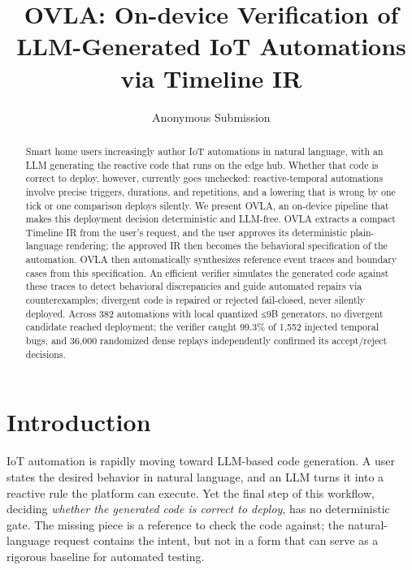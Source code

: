 \documentclass[sigconf,nonacm,anonymous,review]{acmart}
\title{OVLA: On-device Verification of LLM-Generated IoT Automations via Timeline IR}
\author{Anonymous Submission}
\affiliation{\institution{Submitted to SenSys 2027}\country{}}
\begin{document}
\begin{abstract}
Smart home users increasingly author IoT automations in natural language, with an LLM generating the reactive code that runs on the edge hub. Whether that code is correct to deploy, however, currently goes unchecked: reactive-temporal automations involve precise triggers, durations, and repetitions, and a lowering that is wrong by one tick or one comparison deploys silently. We present OVLA, an on-device pipeline that makes this deployment decision deterministic and LLM-free. OVLA extracts a compact Timeline IR from the user's request, and the user approves its deterministic plain-language rendering; the approved IR then becomes the behavioral specification of the automation. OVLA then automatically synthesizes reference event traces and boundary cases from this specification. An efficient verifier simulates the generated code against these traces to detect behavioral discrepancies and guide automated repairs via counterexamples; divergent code is repaired or rejected fail-closed, never silently deployed. Across 382 automations with local quantized ≤9B generators, no divergent candidate reached deployment; the verifier caught 99.3\% of 1,552 injected temporal bugs, and 36,000 randomized dense replays independently confirmed its accept/reject decisions.
\end{abstract}


\maketitle

\section{Introduction}

IoT automation is rapidly moving toward LLM-based code generation. A user states the desired behavior in natural language, and an LLM turns it into a reactive rule the platform can execute. Yet the final step of this workflow, deciding \emph{whether the generated code is correct to deploy}, has no deterministic gate. The missing piece is a reference to check the code against; the natural-language request contains the intent, but not in a form that can serve as a rigorous baseline for automated testing.
\end{document}
